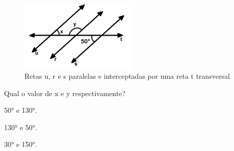 \begin{escolha}
\begin{boxmedio}
\begin{boxmedio}
{\begin{boxpeq}
\begin{boxpeq}
{\begin{boxpeq}
\begin{boxmedio}
\begin{boxmedio}
\begin{boxpeq}
\begin{boxmedio}
\begin{boxpeq}
\begin{boxpeq}
\begin{boxpeq}
\begin{boxpeq}
\begin{boxmedio}
{\begin{boxmedio}
\begin{boxmedio}
\begin{boxpeq}
\begin{boxmedio}
\begin{boxpeq}
\begin{boxpeq}
\begin{boxpeq}
\begin{escolha}
{\begin{boxmedio}
\begin{boxpeq}
\begin{boxpeq}
\begin{boxpeq}
\begin{boxpeq}
\begin{boxpeq}
\begin{boxmedio}
\begin{boxpeq}
\begin{boxpeq}
\begin{boxpeq}
{\begin{boxpeq}
\begin{boxmedio}
\begin{boxpeq}
\begin{boxpeq}
\begin{boxpeq}
{\begin{boxpeq}
\begin{boxmedio}
{\begin{boxpeq}
\begin{boxpeq}
\begin{boxmedio}
\begin{boxmedio}
\begin{boxpeq}
\begin{boxpeq}
{\begin{boxpeq}
\begin{boxpeq}
\begin{boxpeq}
\begin{boxpeq}
\begin{boxpeq}
\begin{escolha}
\begin{escolha}
{\begin{boxmedio}
\begin{boxpeq}
\begin{q°}
\begin{boxmedio}
\begin{boxpeq}
\begin{boxpeq}
\begin{boxmedio}
\begin{boxmedio}
\begin{boxmedio}
\begin{boxmedio}
{\begin{enumerate}
\begin{boxpeq}
{\begin{boxpeq}
\begin{boxpeq}
\begin{boxmedio}
\begin{boxpeq}
\begin{boxpeq}
\begin{boxpeq}
\begin{escolha}
\begin{escolha}
\begin{figure}
\includegraphics[width=2.19271in,height=1.32816in]{./_SAEB_9_MAT/media/image248.jpeg}
\caption{Retas u, r e s paralelas e interceptadas por uma reta t
transversal}
\end{figure}

Qual o valor de x e y respectivamente?

\begin{escolha}

  \item 50° e 130°.

  \item 130° e 50°.

  \item 30° e 150°.


\end{escolha}
\end{escolha}
\end{escolha}
\end{boxpeq}
\end{boxpeq}
\end{boxpeq}
\end{boxmedio}
\end{boxpeq}
\end{boxpeq}}
\end{boxpeq}
\end{enumerate}}
\end{boxmedio}
\end{boxmedio}
\end{boxmedio}
\end{boxmedio}
\end{boxpeq}
\end{boxpeq}
\end{boxmedio}
\end{q°}
\end{boxpeq}
\end{boxmedio}}
\end{escolha}
\end{escolha}
\end{boxpeq}
\end{boxpeq}
\end{boxpeq}
\end{boxpeq}
\end{boxpeq}}
\end{boxpeq}
\end{boxpeq}
\end{boxmedio}
\end{boxmedio}
\end{boxpeq}
\end{boxpeq}}
\end{boxmedio}
\end{boxpeq}}
\end{boxpeq}
\end{boxpeq}
\end{boxpeq}
\end{boxmedio}
\end{boxpeq}}
\end{boxpeq}
\end{boxpeq}
\end{boxpeq}
\end{boxmedio}
\end{boxpeq}
\end{boxpeq}
\end{boxpeq}
\end{boxpeq}
\end{boxpeq}
\end{boxmedio}}
\end{escolha}
\end{boxpeq}
\end{boxpeq}
\end{boxpeq}
\end{boxmedio}
\end{boxpeq}
\end{boxmedio}
\end{boxmedio}}
\end{boxmedio}
\end{boxpeq}
\end{boxpeq}
\end{boxpeq}
\end{boxpeq}
\end{boxmedio}
\end{boxpeq}
\end{boxmedio}
\end{boxmedio}
\end{boxpeq}}
\end{boxpeq}
\end{boxpeq}}
\end{boxmedio}
\end{boxmedio}
\end{escolha}
